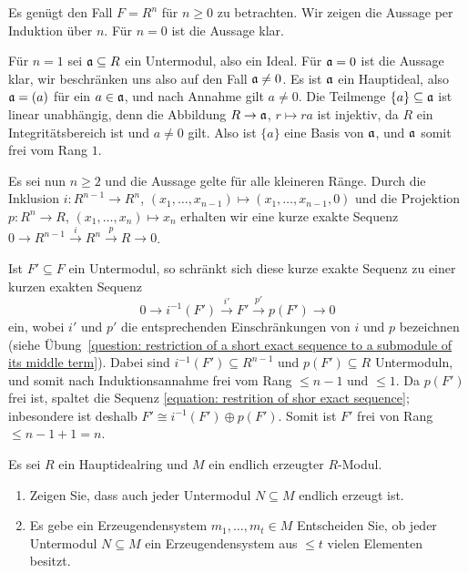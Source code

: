 \begin{solution}
  Es genügt den Fall $F = R^n$ für $n \geq 0$ zu betrachten.
  Wir zeigen die Aussage per Induktion über $n$.
  Für $n = 0$ ist die Aussage klar.
  
  Für $n = 1$ sei $\mathfrak{a} \subseteq R$ ein Untermodul, also ein Ideal.
  Für $\mathfrak{a} = 0$ ist die Aussage klar, wir beschränken uns also auf den Fall $\mathfrak{a} \neq 0$.
  Es ist $\mathfrak{a}$ ein Hauptideal, also $\mathfrak{a} = (a)$ für ein $a \in \mathfrak{a}$, und nach Annahme gilt $a \neq 0$.
  Die Teilmenge $\{a\} \subseteq \mathfrak{a}$ ist linear unabhängig, denn die Abbildung $R \to \mathfrak{a}$, $r \mapsto ra$ ist injektiv, da $R$ ein Integritätsbereich ist und $a \neq 0$ gilt.
  Also ist $\{a\}$ eine Basis von $\mathfrak{a}$, und $\mathfrak{a}$ somit frei vom Rang $1$.
  
  Es sei nun $n \geq 2$ und die Aussage gelte für alle kleineren Ränge.
  Durch die Inklusion $i \colon R^{n-1} \to R^n$, $(x_1, \dotsc, x_{n-1}) \mapsto (x_1, \dotsc, x_{n-1}, 0)$ und die Projektion $p \colon R^n \to R$, $(x_1, \dotsc, x_n) \mapsto x_n$ erhalten wir eine kurze exakte Sequenz $0 \to R^{n-1} \xrightarrow{i} R^n \xrightarrow{p} R \to 0$.
  
  Ist $F' \subseteq F$ ein Untermodul, so schränkt sich diese kurze exakte Sequenz zu einer kurzen exakten Sequenz
  \begin{equation}
    \label{equation: restrition of shor exact sequence}
    0 \to i^{-1}(F') \xrightarrow{i'} F' \xrightarrow{p'} p(F') \to 0
  \end{equation}
  ein, wobei $i'$ und $p'$ die entsprechenden Einschränkungen von $i$ und $p$ bezeichnen (siehe Übung~\ref{question: restriction of a short exact sequence to a submodule of its middle term}).
  Dabei sind $i^{-1}(F') \subseteq R^{n-1}$ und $p(F') \subseteq R$ Untermoduln, und somit nach Induktionsannahme frei vom Rang $\leq n-1$ und $\leq 1$.
  Da $p(F')$ frei ist, spaltet die Sequenz \eqref{equation: restrition of shor exact sequence};
  inbesondere ist deshalb $F' \cong i^{-1}(F') \oplus p(F')$.
  Somit ist $F'$ frei von Rang $\leq n-1 + 1 = n$.
\end{solution}


\begin{question}
  Es sei $R$ ein Hauptidealring und $M$ ein endlich erzeugter $R$-Modul.
  \begin{enumerate}
    \item
      Zeigen Sie, dass auch jeder Untermodul $N \subseteq M$ endlich erzeugt ist.
    \item
      Es gebe ein Erzeugendensystem $m_1, \dotsc, m_t \in M$
      Entscheiden Sie, ob jeder Untermodul $N \subseteq M$ ein Erzeugendensystem aus $\leq t$ vielen Elementen besitzt.
  \end{enumerate}
\end{question}


